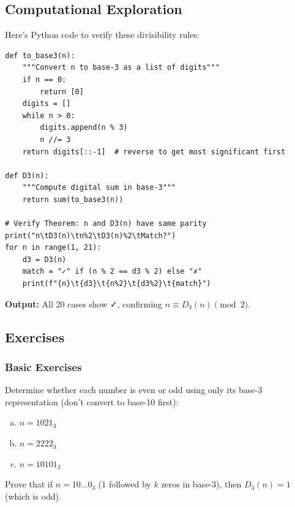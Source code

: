 \subsection{Computational Exploration}
\label{subsec:computational-divisibility}


Here's Python code to verify these divisibility rules:

\begin{lstlisting}[style=python]
def to_base3(n):
    """Convert n to base-3 as a list of digits"""
    if n == 0:
        return [0]
    digits = []
    while n > 0:
        digits.append(n % 3)
        n //= 3
    return digits[::-1]  # reverse to get most significant first

def D3(n):
    """Compute digital sum in base-3"""
    return sum(to_base3(n))

# Verify Theorem: n and D3(n) have same parity
print("n\tD3(n)\tn%2\tD3(n)%2\tMatch?")
for n in range(1, 21):
    d3 = D3(n)
    match = "✓" if (n % 2 == d3 % 2) else "✗"
    print(f"{n}\t{d3}\t{n%2}\t{d3%2}\t{match}")
\end{lstlisting}

\textbf{Output:} All 20 cases show ✓, confirming $n \equiv D_3(n) \pmod{2}$.

\subsection{Exercises}
\label{subsec:divisibility-exercises}

\subsubsection*{Basic Exercises}

\begin{exercise}
Determine whether each number is even or odd using only its base-3 representation (don't convert to base-10 first):
\begin{enumerate}[(a)]
\item $n = 1021_3$
\item $n = 2222_3$
\item $n = 10101_3$
\end{enumerate}
\end{exercise}

\begin{exercise}
Prove that if $n = 10\ldots0_3$ (1 followed by $k$ zeros in base-3), then $D_3(n) = 1$ (which is odd).
\end{exercise}

